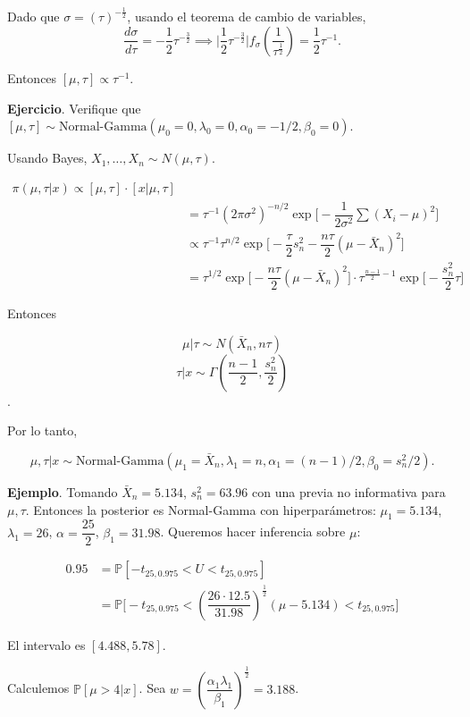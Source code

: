 \documentclass[
  12pt,
]{book}
\begin{document}
Dado que \(\sigma = (\tau)^{-\frac{1}2}\), usando el teorema de cambio de variables,
\[\dfrac{d\sigma}{d\tau} = -\dfrac12\tau^{-\frac32} \implies
\bigg|\dfrac12\tau^{-\frac32}\bigg|f_\sigma\left(\dfrac 1{\tau^{\frac12}}\right) = \dfrac
12 \tau^{-1}.\]

Entonces \([\mu,\tau]\propto\tau^{-1}\).

\textbf{Ejercicio}. Verifique que \([\mu,\tau]\sim \text{Normal-Gamma}(\mu_0=0,\lambda_0=0,\alpha_0=-1/2,\beta_0=0)\).

Usando Bayes, \(X_1,\dots,X_n \sim N(\mu, \tau)\).

\begin{align*}
 \pi(\mu,\tau|x) \propto [\mu,\tau]\cdot[x|\mu, \tau] \\ & = \tau^{-1} (2\pi\sigma^2)^{-n/2}\exp\bigg[-\dfrac 1{2\sigma^2}\sum (X_i-\mu)^2\bigg]\\
 & \propto \tau^{-1} \tau^{n/2} \exp\bigg[-\dfrac \tau 2 s_n^2 - \dfrac{n\tau}{2}(\mu-\bar X_n)^2\bigg]\\
 & = \tau^{1/2} \exp\bigg[-\dfrac{n\tau}2 (\mu-\bar X_n)^2\bigg]\cdot \tau^{\frac{n-1}{2}-1}\exp\bigg[-\dfrac{s_n^2}{2}\tau \bigg]
 \end{align*}

Entonces

\[\mu|\tau \sim N(\bar X_n,n\tau)\]
\[\tau|x\sim \Gamma\left(\dfrac{n-1}2, \dfrac{s_n^2}{2}\right)\].

Por lo tanto,

\[\mu,\tau|x \sim \text{Normal-Gamma}(\mu_1 = \bar X_n,\lambda_1=n,\alpha_1=(n-1)/2,\beta_0=s_n^2/2).\]

\textbf{Ejemplo}. Tomando \(\bar X_n = 5.134\), \(s_n^2 = 63.96\) con una previa no
informativa para \(\mu,\tau\). Entonces la posterior es Normal-Gamma con
hiperparámetros: \(\mu_1 = 5.134\), \(\lambda_1 = 26\), \(\alpha = \dfrac{25}2\),
\(\beta_1 = 31.98\). Queremos hacer inferencia sobre \(\mu\):

\begin{align*}
 0.95 & = \mathbb P[-t_{25,0.975}<U<t_{25,0.975}]\\
 & = \mathbb P\bigg[-t_{25,0.975}<\left(\dfrac{26\cdot 12.5}{31.98}\right)^{\frac 12}(\mu-5.134) <t_{25,0.975}\bigg]
 \end{align*}

El intervalo es \([4.488,5.78]\).

Calculemos \(\mathbb P[\mu>4|x]\). Sea \(w =\left(\dfrac{\alpha_1\lambda_1}{\beta_1}\right)^{\frac 12} = 3.188\).
\end{document}
